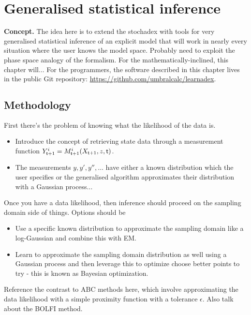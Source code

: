\chapter{\sffamily Generalised statistical inference}

{\bfseries\sffamily Concept.} The idea here is to extend the stochadex with tools for very generalised statistical inference of an explicit model that will work in nearly every situation where the user knows the model space. Probably need to exploit the phase space analogy of the formalism. For the mathematically-inclined, this chapter will... For the programmers, the software described in this chapter lives in the public Git repository: \href{https://github.com/umbralcalc/learnadex}{https://github.com/umbralcalc/learnadex}.


\section{\sffamily Methodology}

First there's the problem of knowing what the likelihood of the data is.
\begin{itemize}
\item{Introduce the concept of retrieving state data through a measurement function $Y^i_{{\sf t}+1} = M^i_{{\sf t}+1}(X_{{\sf t}+1},z,{\sf t})$.}
\item{The measurements $y, y', y'', \dots$ have either a known distribution which the user specifies or the generalised algorithm approximates their distribution with a Gaussian process...}
\end{itemize}
Once you have a data likelihood, then inference should proceed on the sampling domain side of things. Options should be
\begin{itemize}
\item{Use a specific known distribution to approximate the sampling domain like a log-Gaussian and combine this with EM.}
\item{Learn to approximate the sampling domain distribution as well using a Gaussian process and then leverage this to optimize choose better points to try - this is known as Bayesian optimization.} 
\end{itemize}

Reference the contrast to ABC methods here, which involve approximating the data likelihood with a simple proximity function with a tolerance $\epsilon$. Also talk about the BOLFI method.